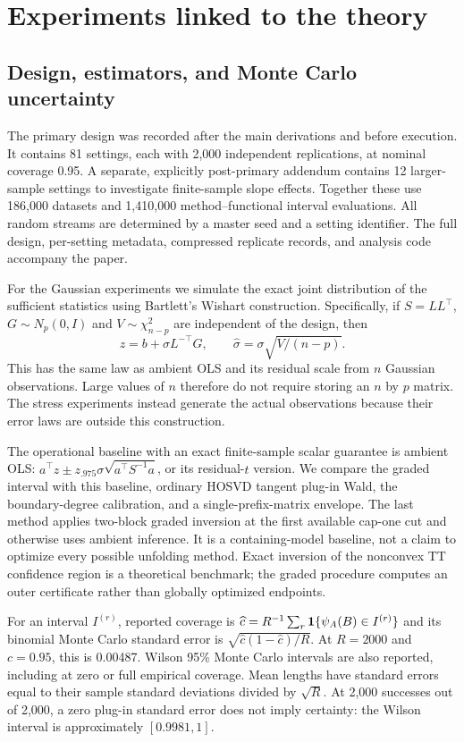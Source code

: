 \section{Experiments linked to the theory}\label{sec:experiments}
\subsection{Design, estimators, and Monte Carlo uncertainty}
The primary design was recorded after the main derivations and before execution. It contains 81 settings, each with 2,000 independent replications, at nominal coverage 0.95. A separate, explicitly post-primary addendum contains 12 larger-sample settings to investigate finite-sample slope effects. Together these use 186,000 datasets and 1,410,000 method--functional interval evaluations. All random streams are determined by a master seed and a setting identifier. The full design, per-setting metadata, compressed replicate records, and analysis code accompany the paper.

For the Gaussian experiments we simulate the exact joint distribution of the sufficient statistics using Bartlett's Wishart construction. Specifically, if $S=LL^\top$, $G\sim N_p(0,I)$ and $V\sim\chi^2_{n-p}$ are independent of the design, then
\[
 z=b+\sigma L^{-\top}G,\qquad \widehat\sigma=\sigma\sqrt{V/(n-p)}.
\]
This has the same law as ambient OLS and its residual scale from $n$ Gaussian observations. Large values of $n$ therefore do not require storing an $n$ by $p$ matrix. The stress experiments instead generate the actual observations because their error laws are outside this construction.

The operational baseline with an exact finite-sample scalar guarantee is ambient OLS: $a^\top z\pm z_{.975}\sigma\sqrt{a^\top S^{-1}a}$, or its residual-$t$ version. We compare the graded interval with this baseline, ordinary HOSVD tangent plug-in Wald, the boundary-degree calibration, and a single-prefix-matrix envelope. The last method applies two-block graded inversion at the first available cap-one cut and otherwise uses ambient inference. It is a containing-model baseline, not a claim to optimize every possible unfolding method. Exact inversion of the nonconvex TT confidence region is a theoretical benchmark; the graded procedure computes an outer certificate rather than globally optimized endpoints.

For an interval $I^{(r)}$, reported coverage is $\widehat c=R^{-1}\sum_r\mathbf 1\{\psi_A(B)\in I^{(r)}\}$ and its binomial Monte Carlo standard error is $\sqrt{\widehat c(1-\widehat c)/R}$. At $R=2000$ and $c=0.95$, this is 0.00487. Wilson 95\% Monte Carlo intervals are also reported, including at zero or full empirical coverage. Mean lengths have standard errors equal to their sample standard deviations divided by $\sqrt R$. At 2,000 successes out of 2,000, a zero plug-in standard error does not imply certainty: the Wilson interval is approximately $[0.9981,1]$.

